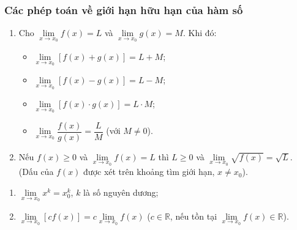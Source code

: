 \begin{tomtat}
	\subsubsection{Các phép toán về giới hạn hữu hạn của hàm số}
		\begin{enumerate}
			\item Cho $ \lim \limits_{x \to x_0} f(x) =L$ và $ \lim \limits_{x \to x_0} g(x)=M $. Khi đó:
			\begin{itemize}
				\item $ \lim \limits_{x \to x_0} [f(x)+g(x)]=L+M $;
				\item $ \lim \limits_{x \to x_0} [f(x)-g(x)]=L-M $;
				\item $ \lim \limits_{x \to x_0} [f(x)\cdot g(x)]=L\cdot M $;
				\item $ \lim \limits_{x \to x_0} \dfrac{f(x)}{g(x)}=\dfrac{L}{M} $ (với $ M\neq 0 $).			
			\end{itemize}
			\item Nếu $ f(x)\geq 0 $ và $ \lim \limits_{x \to x_0} f(x) =L$ thì $ L\geq 0 $ và $ \lim \limits_{x \to x_0} \sqrt{f(x)}=\sqrt{L} $.\\
			(Dấu của $ f(x) $ được xét trên khoảng tìm giới hạn, $ x\neq x_0 $).
		\end{enumerate}
\begin{note} 
	\indent
	\begin{enumerate}
		\item $ \lim \limits_{x \to x_0} x^k=x_0^k $, $ k $ là số nguyên dương;
		\item $ \lim \limits_{x \to x_0} [cf(x)]=c\lim \limits_{x \to x_0} f(x) $ ($ c\in \mathbb{R} $, nếu tồn tại $ \lim \limits_{x \to x_0} f(x) \in \mathbb{R}$).
	\end{enumerate}
\end{note} 


\end{tomtat}

